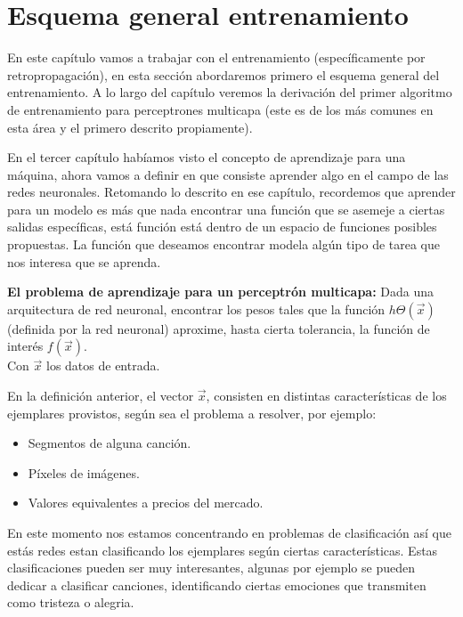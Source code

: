 \section{Esquema general entrenamiento}
 
 En este capítulo vamos a trabajar con el entrenamiento (específicamente por retropropagación), en esta sección abordaremos primero el esquema general del entrenamiento. 
 A lo largo del capítulo veremos la derivación del primer algoritmo de entrenamiento para perceptrones multicapa (este es de los más comunes en esta área y el primero descrito propiamente).

En el tercer capítulo habíamos visto el concepto de aprendizaje para una máquina, ahora vamos a definir en que consiste aprender algo en el campo de las redes neuronales. Retomando lo descrito en ese capítulo, recordemos que aprender para un modelo es más que nada encontrar una función que se asemeje a ciertas salidas específicas, está función está dentro de un espacio de funciones posibles propuestas. La función que deseamos encontrar modela algún tipo de tarea que nos interesa que se aprenda. 

\begin{definition}
 \textbf{El problema de aprendizaje para un perceptrón multicapa:} Dada una arquitectura de red neuronal, encontrar los pesos tales que la función $h\Theta(\vec{x}) $ (definida por la red neuronal) aproxime, hasta cierta tolerancia, la función de interés $ f(\vec{x})$. \\ Con $\vec{x}$ los datos de entrada.
 
\end{definition}

En la definición anterior, el vector $\vec{x}$, consisten en distintas características de los ejemplares provistos, según sea el problema a resolver, por ejemplo:
\begin{itemize}
 \item Segmentos de alguna canción.
 \item Píxeles de imágenes.
 \item Valores equivalentes a precios del mercado.
\end{itemize}

En este momento nos estamos concentrando en problemas de clasificación así que estás redes estan clasificando los ejemplares según ciertas características. Estas clasificaciones pueden ser muy interesantes, algunas por ejemplo se pueden dedicar a clasificar canciones, identificando ciertas emociones que transmiten como tristeza o alegria. 

